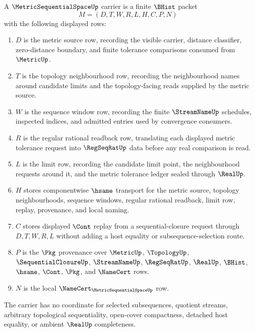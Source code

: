 \begin{definition}
\label{def:metric-sequential-space-carrier}
A $\MetricSequentialSpaceUp$ carrier is a finite $\BHist$ packet
$$
M=(D,T,W,R,L,H,C,P,N)
$$
with the following displayed rows:
\begin{enumerate}
\item $D$ is the metric source row, recording the visible carrier, distance classifier, zero-distance boundary, and finite tolerance comparisons consumed from $\MetricUp$.
\item $T$ is the topology neighbourhood row, recording the neighbourhood names around candidate limits and the topology-facing reads supplied by the metric source.
\item $W$ is the sequence window row, recording the finite $\StreamNameUp$ schedules, inspected indices, and admitted entries used by convergence consumers.
\item $R$ is the regular rational readback row, translating each displayed metric tolerance request into $\RegSeqRatUp$ data before any real comparison is read.
\item $L$ is the limit row, recording the candidate limit point, the neighbourhood requests around it, and the metric tolerance ledger sealed through $\RealUp$.
\item $H$ stores componentwise $\hsame$ transport for the metric source, topology neighbourhoods, sequence windows, regular rational readback, limit row, replay, provenance, and local naming.
\item $C$ stores displayed $\Cont$ replay from a sequential-closure request through $D,T,W,R,L$ without adding a host equality or subsequence-selection route.
\item $P$ is the $\Pkg$ provenance over $\MetricUp$, $\TopologyUp$, $\SequentialClosureUp$, $\StreamNameUp$, $\RegSeqRatUp$, $\RealUp$, $\BHist$, $\hsame$, $\Cont$, $\Pkg$, and $\NameCert$ rows.
\item $N$ is the local $\NameCert_{\MetricSequentialSpaceUp}$ row.
\end{enumerate}
The carrier has no coordinate for selected subsequences, quotient streams, arbitrary topological sequentiality, open-cover compactness, detached host equality, or ambient $\RealUp$ completeness.
\end{definition}

